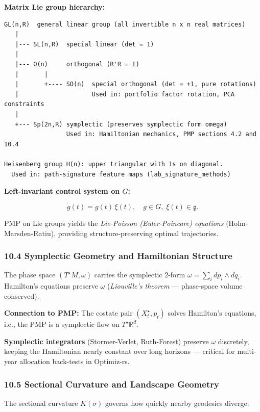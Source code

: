 \documentclass[11pt,a4paper]{article}
\begin{document}
\textbf{Matrix Lie group hierarchy:}

\begin{verbatim}
GL(n,R)  general linear group (all invertible n x n real matrices)
   |
   |--- SL(n,R)  special linear (det = 1)
   |
   |--- O(n)     orthogonal (R'R = I)
   |       |
   |       +---- SO(n)  special orthogonal (det = +1, pure rotations)
   |                    Used in: portfolio factor rotation, PCA constraints
   |
   +--- Sp(2n,R) symplectic (preserves symplectic form omega)
                 Used in: Hamiltonian mechanics, PMP sections 4.2 and 10.4

Heisenberg group H(n): upper triangular with 1s on diagonal.
  Used in: path-signature feature maps (lab_signature_methods)
\end{verbatim}

\textbf{Left-invariant control system on \(G\):}

\[\dot g(t) = g(t)\,\xi(t), \quad g\in G,\; \xi(t)\in\mathfrak{g}.\]

PMP on Lie groups yields the \emph{Lie-Poisson (Euler-Poincare) equations} (Holm-Marsden-Ratiu), providing structure-preserving optimal trajectories.

\subsubsection{10.4 Symplectic Geometry and Hamiltonian Structure}\label{symplectic-geometry-and-hamiltonian-structure}

The phase space \((T^\star M, \omega)\) carries the symplectic 2-form \(\omega = \sum_i dp_i \wedge dq_i\). Hamilton's equations preserve \(\omega\) (\emph{Liouville's theorem} --- phase-space volume conserved).

\textbf{Connection to PMP:} The costate pair \((X_t^\star, p_t)\) solves Hamilton's equations, i.e., the PMP is a symplectic flow on \(T^\star\mathbb{R}^d\).

\textbf{Symplectic integrators} (Stormer-Verlet, Ruth-Forest) preserve \(\omega\) discretely, keeping the Hamiltonian nearly constant over long horizons --- critical for multi-year allocation back-tests in Optimiz-rs.

\subsubsection{10.5 Sectional Curvature and Landscape Geometry}\label{sectional-curvature-and-landscape-geometry}

The sectional curvature \(K(\sigma)\) governs how quickly nearby geodesics diverge:
\end{document}
